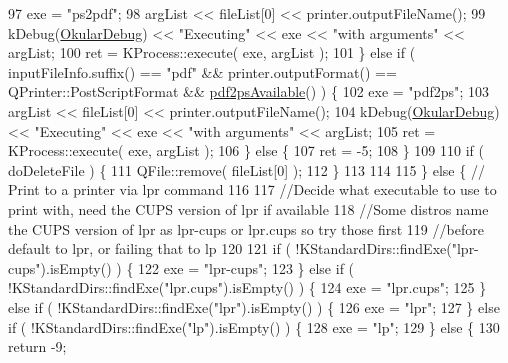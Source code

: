 \begin{DoxyCode}
97             exe = \textcolor{stringliteral}{"ps2pdf"};
98             argList << fileList[0] << printer.outputFileName();
99             kDebug(\hyperlink{debug__p_8h_af16c6e32a95969dd0605d792ec9807c7}{OkularDebug}) << \textcolor{stringliteral}{"Executing"} << exe << \textcolor{stringliteral}{"with arguments"} << argList;
100             ret = KProcess::execute( exe, argList );
101         \} \textcolor{keywordflow}{else} \textcolor{keywordflow}{if} ( inputFileInfo.suffix() == \textcolor{stringliteral}{"pdf"} && printer.outputFormat() == QPrinter::PostScriptFormat
       && \hyperlink{classOkular_1_1FilePrinter_af93f96fc338c59335071b664437df886}{pdf2psAvailable}() ) \{
102             exe = \textcolor{stringliteral}{"pdf2ps"};
103             argList << fileList[0] << printer.outputFileName();
104             kDebug(\hyperlink{debug__p_8h_af16c6e32a95969dd0605d792ec9807c7}{OkularDebug}) << \textcolor{stringliteral}{"Executing"} << exe << \textcolor{stringliteral}{"with arguments"} << argList;
105             ret = KProcess::execute( exe, argList );
106         \} \textcolor{keywordflow}{else} \{
107             ret = -5;
108         \}
109 
110         \textcolor{keywordflow}{if} ( doDeleteFile ) \{
111             QFile::remove( fileList[0] );
112         \}
113 
114 
115     \} \textcolor{keywordflow}{else} \{  \textcolor{comment}{// Print to a printer via lpr command}
116 
117         \textcolor{comment}{//Decide what executable to use to print with, need the CUPS version of lpr if available}
118         \textcolor{comment}{//Some distros name the CUPS version of lpr as lpr-cups or lpr.cups so try those first }
119         \textcolor{comment}{//before default to lpr, or failing that to lp}
120 
121         \textcolor{keywordflow}{if} ( !KStandardDirs::findExe(\textcolor{stringliteral}{"lpr-cups"}).isEmpty() ) \{
122             exe = \textcolor{stringliteral}{"lpr-cups"};
123         \} \textcolor{keywordflow}{else} \textcolor{keywordflow}{if} ( !KStandardDirs::findExe(\textcolor{stringliteral}{"lpr.cups"}).isEmpty() ) \{
124             exe = \textcolor{stringliteral}{"lpr.cups"};
125         \} \textcolor{keywordflow}{else} \textcolor{keywordflow}{if} ( !KStandardDirs::findExe(\textcolor{stringliteral}{"lpr"}).isEmpty() ) \{
126             exe = \textcolor{stringliteral}{"lpr"};
127         \} \textcolor{keywordflow}{else} \textcolor{keywordflow}{if} ( !KStandardDirs::findExe(\textcolor{stringliteral}{"lp"}).isEmpty() ) \{
128             exe = \textcolor{stringliteral}{"lp"};
129         \} \textcolor{keywordflow}{else} \{
130             \textcolor{keywordflow}{return} -9;

\end{DoxyCode}

